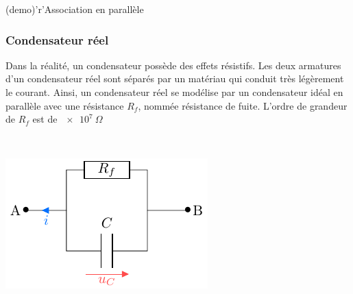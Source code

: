 \documentclass[../../main/main.tex]{subfiles}
\begin{document}
\begin{tcbraster}[raster columns=2, raster equal height=rows]
\begin{tcb}[label=prop:cpara]
\begin{center}
{			}
		\end{center}
	\end{tcb}
	\begin{tcb}[label=demo:cpara](demo)'r'{Association en parallèle}
	\end{tcb}
\end{tcbraster}

\subsubsection{Condensateur réel}

\noindent
\begin{minipage}[t]{.69\linewidth}
	Dans la réalité, un condensateur possède des effets résistifs.
	Les deux armatures d'un condensateur réel sont séparés par un matériau
	qui conduit très légèrement le courant. Ainsi, un condensateur réel se
	modélise par un condensateur idéal en parallèle avec une résistance $R_f$,
	nommée résistance de fuite.
	\smallbreak
	L'ordre de grandeur de $R_f$ est de $\SI{e7}{\Omega}$
\end{minipage}
\hfill
\begin{minipage}[t]{.30\linewidth}
	~
	\vspace{-40pt}
	\begin{center}
		\includegraphics[width=\linewidth]{creel}
		\label{fig:creel}
	\end{center}
\end{minipage}
\end{document}
